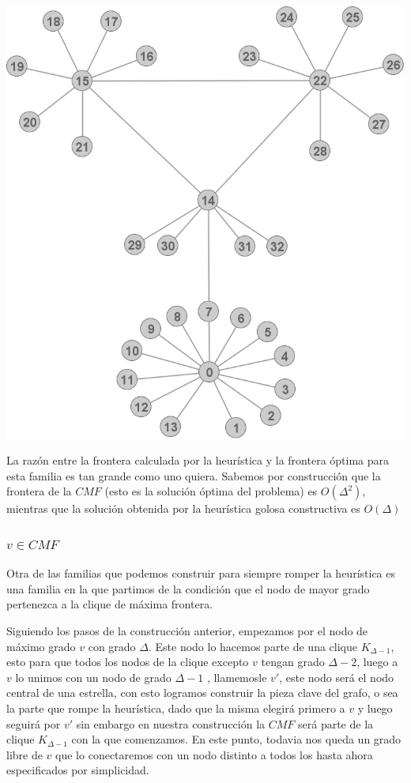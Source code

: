 \begin{center} 
	\includegraphics[scale = 0.5]{img/ej3/constructiva_golosa/faulty_st0.png} 
\end{center}

La raz\'on entre la frontera calculada por la heur\'istica y la frontera \'optima para 
esta familia es tan grande como uno quiera. Sabemos por construcci\'on que la frontera
de la $CMF$ (esto es la soluci\'on \'optima del problema) es $O(\Delta^2)$, mientras
que la soluci\'on obtenida por la heur\'istica golosa constructiva es $O(\Delta)$


\subsubsection{$v \in CMF$}

Otra de las familias que podemos construir para siempre romper la heur\'istica 
es una familia en la que partimos de la condici\'on que el nodo de mayor grado
pertenezca a la clique de m\'axima frontera. 

Siguiendo los pasos de la construcci\'on anterior, empezamos por el nodo de 
m\'aximo grado $v$ con grado $\Delta$. Este nodo lo hacemos parte de una clique
$K_{\Delta -1}$, esto para que todos los nodos de la clique excepto $v$ tengan
grado $\Delta -2$, luego a $v$ lo unimos con un nodo de grado $\Delta -1$ , 
llamemosle $v'$, este nodo ser\'a el nodo central de una estrella, 
con esto logramos construir la pieza clave del grafo, 
o sea la parte que rompe la heur\'istica, dado que la misma elegir\'a primero 
a $v$ y luego seguir\'a por $v'$ sin embargo en nuestra construcci\'on la $CMF$
ser\'a parte de la clique $K_{\Delta -1}$ con la que comenzamos.
En este punto, todavia nos queda un grado libre de $v$ que lo conectaremos con un
nodo distinto a todos los hasta ahora especificados por simplicidad.

